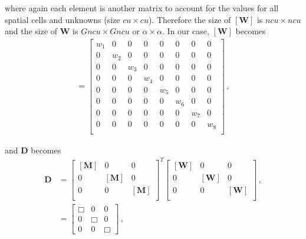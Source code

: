\documentclass[10pt]{article}
\begin{document}
where again each element is another matrix to account for the values for all spatial cells and unknowns (size $cu \times cu$). Therefore the size of $[\textbf{W}]$ is $ncu \times ncu$ and the size of $\textbf{W}$ is $Gncu \times Gncu$ or $\alpha \times \alpha$. In our case, $[\textbf{W}]$ becomes
%
\begin{align*}
[\textbf{W}] = 
\begin{bmatrix}
    w_1 & 0 & 0 & 0 & 0 & 0 & 0 & 0 \\
    0 & w_2 & 0 & 0 & 0 & 0 & 0 & 0 \\
    0 & 0 & w_3 & 0 & 0 & 0 & 0 & 0 \\
    0 & 0 & 0 & w_4 & 0 & 0 & 0 & 0 \\
    0 & 0 & 0 & 0 & w_5 & 0 & 0 & 0 \\
    0 & 0 & 0 & 0 & 0 & w_6 & 0 & 0 \\
    0 & 0 & 0 & 0 & 0 & 0 & w_7 & 0 \\
    0 & 0 & 0 & 0 & 0 & 0 & 0 & w_8 \\
\end{bmatrix}\,,
\end{align*}

and $\textbf{D}$ becomes
%
\begin{align*}
\textbf{D} &=
\begin{bmatrix}
    [\textbf{M}] & 0  & 0  \\
    0 & [\textbf{M}]  & 0  \\
    0 & 0 & [\textbf{M}]  \\
\end{bmatrix} ^ T
\begin{bmatrix}
    [\textbf{W}] & 0  & 0  \\
    0 & [\textbf{W}]  & 0  \\
    0 & 0 & [\textbf{W}]  \\
\end{bmatrix}\,, \\
&=
\begin{bmatrix}
\Box & 0 & 0 \\
0 & \Box & 0 \\ 
0 & 0 & \Box
\end{bmatrix}\,,
\end{align*}
\end{document}
